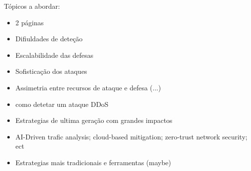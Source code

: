 Tópicos a abordar:
\begin{itemize}
    \item 2 páginas
    \item Difiuldades de deteção
    \item Escalabilidade das defesas
    \item Sofisticação dos ataques
    \item Assimetria entre recursos de ataque e defesa (...)
    \item como detetar um ataque DDoS
    \item Estrategias de ultima geração com grandes impactos
    \item AI-Driven trafic analysis; cloud-based mitigation; zero-trust network security; ect
    \item Estrategias mais tradicionais e ferramentas (maybe)
\end{itemize}
